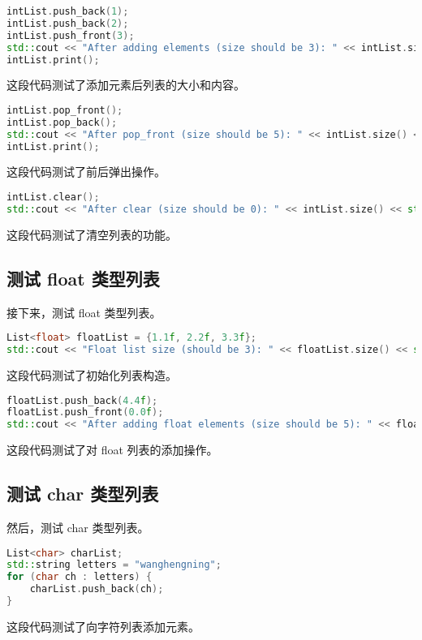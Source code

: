 \documentclass[UTF8]{ctexart}
\begin{document}
\begin{lstlisting}[language=C++]
intList.push_back(1);
intList.push_back(2);
intList.push_front(3);
std::cout << "After adding elements (size should be 3): " << intList.size() << std::endl;
intList.print();
\end{lstlisting}
这段代码测试了添加元素后列表的大小和内容。

\begin{lstlisting}[language=C++]
intList.pop_front();
intList.pop_back();
std::cout << "After pop_front (size should be 5): " << intList.size() << std::endl;
intList.print();
\end{lstlisting}
这段代码测试了前后弹出操作。

\begin{lstlisting}[language=C++]
intList.clear();
std::cout << "After clear (size should be 0): " << intList.size() << std::endl;
\end{lstlisting}
这段代码测试了清空列表的功能。

\subsection{测试 float 类型列表}

接下来，测试 float 类型列表。

\begin{lstlisting}[language=C++]
List<float> floatList = {1.1f, 2.2f, 3.3f};
std::cout << "Float list size (should be 3): " << floatList.size() << std::endl;
\end{lstlisting}
这段代码测试了初始化列表构造。

\begin{lstlisting}[language=C++]
floatList.push_back(4.4f);
floatList.push_front(0.0f);
std::cout << "After adding float elements (size should be 5): " << floatList.size() << std::endl;
\end{lstlisting}
这段代码测试了对 float 列表的添加操作。

\subsection{测试 char 类型列表}

然后，测试 char 类型列表。

\begin{lstlisting}[language=C++]
List<char> charList;
std::string letters = "wanghengning";
for (char ch : letters) {
    charList.push_back(ch);
}
\end{lstlisting}
这段代码测试了向字符列表添加元素。
\end{document}
